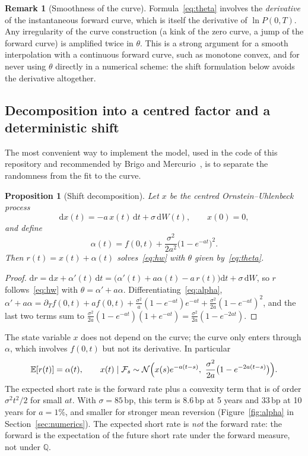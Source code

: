 \documentclass[11pt,a4paper]{article}
\theoremstyle{plain}
\newtheorem{proposition}[theorem]{Proposition}
\theoremstyle{definition}
\newtheorem{remark}[theorem]{Remark}
\newcommand{\dd}{\mathrm{d}}
\newcommand{\E}{\mathbb{E}}
\newcommand{\Q}{\mathbb{Q}}
\newcommand{\F}{\mathcal{F}}
\newcommand{\N}{\mathcal{N}}
\newcommand{\bp}{\,\mathrm{bp}}
\begin{document}
\begin{remark}[Smoothness of the curve]\label{rem:smooth}
Formula~\eqref{eq:theta} involves the \emph{derivative} of the instantaneous forward curve, which is itself the derivative of $\ln P(0,T)$. Any irregularity of the curve construction (a kink of the zero curve, a jump of the forward curve) is amplified twice in $\theta$. This is a strong argument for a smooth interpolation with a continuous forward curve, such as monotone convex, and for never using $\theta$ directly in a numerical scheme: the shift formulation below avoids the derivative altogether.
\end{remark}

\subsection{Decomposition into a centred factor and a deterministic shift}
The most convenient way to implement the model, used in the code of this repository and recommended by Brigo and Mercurio~\cite{brigomercurio}, is to separate the randomness from the fit to the curve.

\begin{proposition}[Shift decomposition]\label{prop:shift}
Let $x$ be the centred Ornstein--Uhlenbeck process
\begin{equation}
    \dd x(t)=-a\,x(t)\,\dd t+\sigma\,\dd W(t),\qquad x(0)=0,
    \label{eq:ou}
\end{equation}
and define
\begin{equation}
    \alpha(t)=f(0,t)+\frac{\sigma^2}{2a^2}\bigl(1-e^{-at}\bigr)^2.
    \label{eq:alpha}
\end{equation}
Then $r(t)=x(t)+\alpha(t)$ solves~\eqref{eq:hw} with $\theta$ given by~\eqref{eq:theta}.
\end{proposition}
\begin{proof}
$\dd r=\dd x+\alpha'(t)\,\dd t=\bigl(\alpha'(t)+a\alpha(t)-a\,r(t)\bigr)\dd t+\sigma\,\dd W$, so $r$ follows~\eqref{eq:hw} with $\theta=\alpha'+a\alpha$. Differentiating~\eqref{eq:alpha},
$\alpha'+a\alpha=\partial_Tf(0,t)+af(0,t)+\frac{\sigma^2}{a}(1-e^{-at})e^{-at}+\frac{\sigma^2}{2a}(1-e^{-at})^2$, and the last two terms sum to $\frac{\sigma^2}{2a}(1-e^{-at})(1+e^{-at})=\frac{\sigma^2}{2a}(1-e^{-2at})$.
\end{proof}

The state variable $x$ does not depend on the curve; the curve only enters through $\alpha$, which involves $f(0,t)$ but not its derivative. In particular
\begin{equation}
    \E[r(t)]=\alpha(t),\qquad
    x(t)\mid\F_s\sim\N\Bigl(x(s)e^{-a(t-s)},\ \frac{\sigma^2}{2a}\bigl(1-e^{-2a(t-s)}\bigr)\Bigr).
    \label{eq:x-law}
\end{equation}
The expected short rate is the forward rate plus a convexity term that is of order $\sigma^2t^2/2$ for small $at$. With $\sigma=85\bp$, this term is $8.6\bp$ at 5 years and $33\bp$ at 10 years for $a=1\%$, and smaller for stronger mean reversion (Figure~\ref{fig:alpha} in Section~\ref{sec:numerics}). The expected short rate is \emph{not} the forward rate: the forward is the expectation of the future short rate under the forward measure, not under $\Q$.
\end{document}
